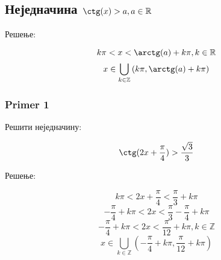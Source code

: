 \documentclass[../diplomski.tex]{subfiles}
\begin{document}
\subsection{Неједначина $\ctg(x)>a,a\in\mathbb{R}$}

Решење:



\[k\pi<x<\arctg(a)+k\pi,k\in\mathbb{R}\]
\[x\in\bigcup_{k\in\mathbb{Z}}\left(k\pi,\arctg(a)+k\pi\right)\]

\subsubsection{Primer 1}

Решити неједначину:

\[\ctg(2x+\frac{\pi}{4})>\frac{\sqrt{3}}{3}\]

Решење:



\[k\pi<2x+\frac{\pi}{4}<\frac{\pi}{3}+k\pi\]
\[-\frac{\pi}{4}+k\pi<2x<\frac{\pi}{3}-\frac{\pi}{4}+k\pi\]
\[-\frac{\pi}{4}+k\pi<2x<\frac{\pi}{12}+k\pi,k\in\mathbb{Z}\]
\[x\in\bigcup_{k\in\mathbb{Z}}\left(-\frac{\pi}{4}+k\pi,\frac{\pi}{12}+k\pi\right)\]
\end{document}
